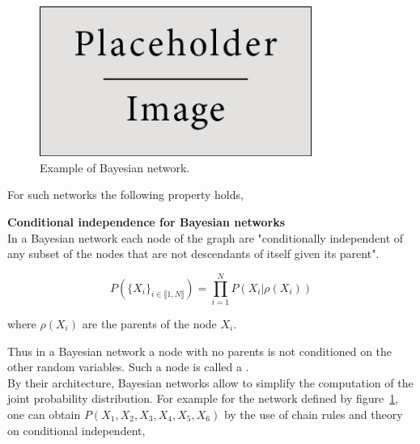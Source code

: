 \documentclass[a4paper,11pt]{report}
\begin{document}
{			\begin{figure}
				\begin{center}
					\includegraphics[width=3.5in]{placeholder.jpg}
					\caption{Example of Bayesian network.} %
					\label{fig:Eg BN}
				\end{center}
			\end{figure}

			For such networks the following property holds,
			
			\begin{prop} \textbf{Conditional independence for Bayesian networks}\\ %
				In a Bayesian network each node of the graph are "conditionally independent of any subset of the nodes that are not descendants of itself given its parent".
				
				\begin{equation}
				  P(\{X_{i}\}_{i \in \llbracket1,N \rrbracket}) = \prod_{i=1}^{N} P(X_{i} | \rho(X_{i}))
				  \label{eq:BN CI}
				\end{equation}
				
				where $\rho(X_{i})$ are the parents of the node $X_{i}$. 
				\label{pty:CI for BNs}
			\end{prop}
			
			Thus in a Bayesian network a node with no parents is not conditioned on the other random variables. Such a node is called a .\\

			By their architecture, Bayesian networks allow to simplify the computation of the joint probability distribution. For example for the network defined by figure~\ref{fig:Eg BN}, one can obtain $P(X_{1},X_{2},X_{3},X_{4},X_{5},X_{6})$ by the use of chain rules and theory on conditional independent,
			
}
\end{document}
